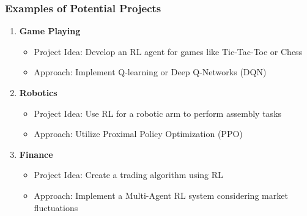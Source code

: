 \documentclass[aspectratio=169]{beamer}
\begin{document}
\begin{frame}[fragile]
    \frametitle{Examples of Potential Projects}
    \begin{enumerate}
        \item \textbf{Game Playing}
            \begin{itemize}
                \item Project Idea: Develop an RL agent for games like Tic-Tac-Toe or Chess
                \item Approach: Implement Q-learning or Deep Q-Networks (DQN)
            \end{itemize}
        \item \textbf{Robotics}
            \begin{itemize}
                \item Project Idea: Use RL for a robotic arm to perform assembly tasks
                \item Approach: Utilize Proximal Policy Optimization (PPO)
            \end{itemize}
        \item \textbf{Finance}
            \begin{itemize}
                \item Project Idea: Create a trading algorithm using RL
                \item Approach: Implement a Multi-Agent RL system considering market fluctuations
            \end{itemize}
    \end{enumerate}
\end{frame}
\end{document}
